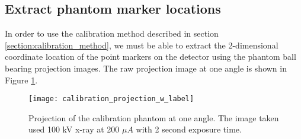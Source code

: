 \subsection{Extract phantom marker locations}
In order to use the calibration method described in section \ref{section:calibration_method}, we must be able to extract the 2-dimensional coordinate location of the point markers on the detector using the phantom ball bearing projection images.  The raw projection image at one angle is shown in Figure \ref{fig:calibration_projection}.

\begin{figure}[ht]
\centering
\texttt{[image: calibration\_projection\_w\_label]}
\caption{Projection of the calibration phantom at one angle.  The image taken used 100 kV x-ray at 200 $\mu A$ with 2 second exposure time.}
\label{fig:calibration_projection}
\end{figure}

